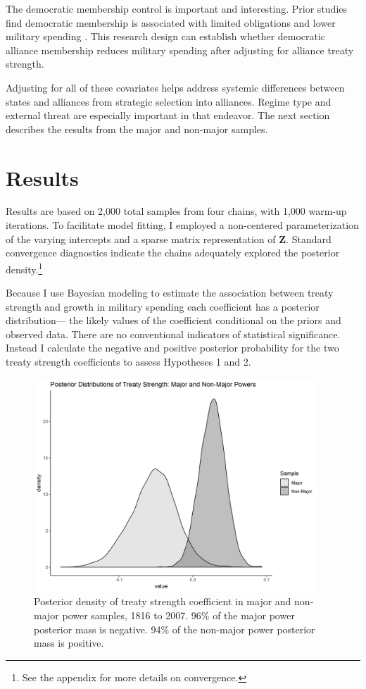 \documentclass[12pt]{article}
\begin{document}
The democratic membership control is important and interesting. 
Prior studies find democratic membership is associated with limited obligations \citep{Chibaetal2015} and lower military spending \citep{DigiuseppePoast2016}.
This research design can establish whether democratic alliance membership reduces military spending after adjusting for alliance treaty strength. 


Adjusting for all of these covariates helps address systemic differences between states and alliances from strategic selection into alliances. 
Regime type and external threat are especially important in that endeavor. 
The next section describes the results from the major and non-major samples.
 

\section{Results}


Results are based on 2,000 total samples from four chains, with 1,000 warm-up iterations. 
To facilitate model fitting, I employed a non-centered parameterization of the varying intercepts and a sparse matrix representation of \textbf{Z}. 
Standard convergence diagnostics indicate the chains adequately explored the posterior density.\footnote{See the appendix for more details on convergence.} 


Because I use Bayesian modeling to estimate the association between treaty strength and growth in military spending each coefficient has a posterior distribution--- the likely values of the coefficient conditional on the priors and observed data.
There are no conventional indicators of statistical significance. 
Instead I calculate the negative and positive posterior probability for the two treaty strength coefficients to assess Hypotheses 1 and 2.


\begin{figure}[htbp]
	\centering
		\includegraphics[width=0.95\textwidth]{../figures/str-dens.png}
	\caption{Posterior density of treaty strength coefficient in major and non-major power samples, 1816 to 2007. 96\% of the major power posterior mass is negative. 94\% of the non-major power posterior mass is positive.}
	\label{fig:str-dens}
\end{figure}
\end{document}
